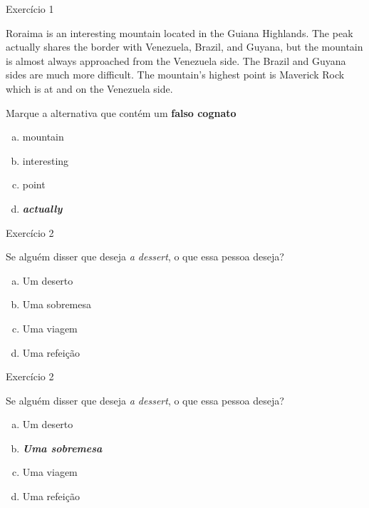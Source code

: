 \documentclass[compress,mathserif]{beamer}
\begin{document}

\begin{frame}{Exercício 1}

Roraima is an interesting mountain located in the Guiana Highlands. The peak actually shares the border with Venezuela, Brazil, and Guyana, but the mountain is almost always approached from the Venezuela side. The Brazil and Guyana sides are much more difficult. The mountain’s highest point is Maverick Rock which is at and on the Venezuela side.

Marque a alternativa que contém um \textbf{falso cognato}

\begin{enumerate}[a)]
    \item mountain
    \item interesting
    \item point
    \item \textit{\textbf{actually}}
\end{enumerate}

\end{frame}


\begin{frame}{Exercício 2}

Se alguém disser que deseja \textit{a dessert}, o que essa pessoa deseja?

\begin{enumerate}[a)]
    \item Um deserto
    \item Uma sobremesa
    \item Uma viagem
    \item Uma refeição
\end{enumerate}

\end{frame}


\begin{frame}{Exercício 2}

Se alguém disser que deseja \textit{a dessert}, o que essa pessoa deseja?

\begin{enumerate}[a)]
    \item Um deserto
    \item \textit{\textbf{Uma sobremesa}}
    \item Uma viagem
    \item Uma refeição
\end{enumerate}

\end{frame}
\end{document}
